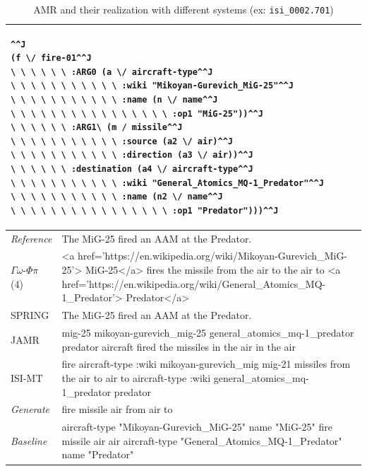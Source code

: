 \documentclass[12pt]{article}
\newcommand{\systeme}[1]{\textsc{#1}}
\newcommand{\gophipy}{$\Gamma\omega$-$\Phi\pi$}
\newcommand{\jamr}{\systeme{JAMR}}
\newcommand{\isimt}{\systeme{ISI-MT}}
\newcommand{\spring}{\systeme{SPRING}}
\begin{document}
\begin{table}[ht]
\begin{tabular}{|p{1in}|p{5.25in}|}%
\hline
\multicolumn{2}{|p{6in}|}{
\begin{lstlisting}^^J
(f \/ fire-01^^J
\ \ \ \ \ \ :ARG0 (a \/ aircraft-type^^J
\ \ \ \ \ \ \ \ \ \ \ :wiki "Mikoyan-Gurevich_MiG-25"^^J
\ \ \ \ \ \ \ \ \ \ \ :name (n \/ name^^J
\ \ \ \ \ \ \ \ \ \ \ \ \ \ \ \ :op1 "MiG-25"))^^J
\ \ \ \ \ \ :ARG1\ (m / missile^^J
\ \ \ \ \ \ \ \ \ \ \ :source (a2 \/ air)^^J
\ \ \ \ \ \ \ \ \ \ \ :direction (a3 \/ air))^^J
\ \ \ \ \ \ :destination (a4 \/ aircraft-type^^J
\ \ \ \ \ \ \ \ \ \ \ :wiki "General_Atomics_MQ-1_Predator"^^J
\ \ \ \ \ \ \ \ \ \ \ :name (n2 \/ name^^J
\ \ \ \ \ \ \ \ \ \ \ \ \ \ \ \ :op1 "Predator")))^^J
\end{lstlisting}
}\\
\hline
\emph{Reference}&  The MiG-25 fired an AAM at the Predator.\\\hline
\gophipy{} (4)&{\raggedright \textless{}a href='https://en.wikipedia.org/wiki/Mikoyan-Gurevich\_MiG-25'\textgreater{} MiG-25\textless{}/a\textgreater{} fires the missile from the air to the air to \textless{}a href='https://en.wikipedia.org/wiki/General\_Atomics\_MQ-1\_Predator'\textgreater{} Predator\textless{}/a\textgreater{}}\\\hline
\spring{}&The MiG-25 fired an AAM at the Predator.\\\hline
\jamr{}&mig-25 mikoyan-gurevich\_mig-25 general\_atomics\_mq-1\_predator predator aircraft fired the missiles in the air in the air
\\\hline
\isimt{}& fire aircraft-type :wiki mikoyan-gurevich\_mig mig-21 missiles from the air to air to aircraft-type :wiki general\_atomics\_mq-1\_predator predator\\\hline
\emph{Generate}& fire missile air from air to\\\hline
\emph{Baseline}&aircraft-type "Mikoyan-Gurevich\_MiG-25" name "MiG-25" fire missile air air aircraft-type "General\_Atomics\_MQ-1\_Predator" name "Predator"\\
\hline
\end{tabular}
\caption{AMR and their realization with different systems (ex: \texttt{isi\_0002.701})}
\label{ex:isi_0002.701}
\end{table}
\end{document}
